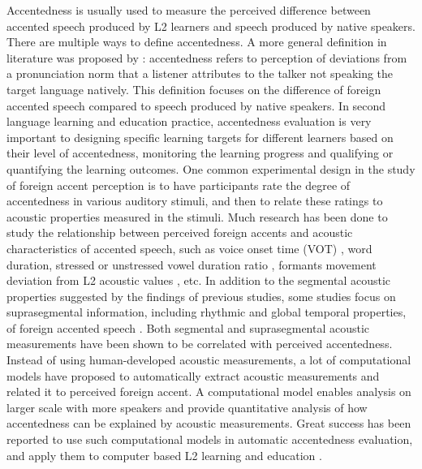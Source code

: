 Accentedness is usually used to measure the perceived difference between accented speech produced by L2 learners and speech produced by native speakers. There are multiple ways to define accentedness. A more general definition in literature was proposed by \cite{mccullough2013acoustic}: accentedness refers to perception of deviations from a pronunciation norm that a listener attributes to the talker not speaking the target language natively. This definition focuses on the difference of foreign accented speech compared to speech produced by native speakers. In second language learning and education practice, accentedness evaluation is very important to designing specific learning targets for different learners based on their level of accentedness, monitoring the learning progress and qualifying or quantifying the learning outcomes. One common experimental design in the study of foreign accent perception is to have participants rate the degree of accentedness in various auditory stimuli, and then to relate these ratings to acoustic properties measured in the stimuli. Much research has been done to study the relationship between perceived foreign accents and acoustic characteristics of accented speech, such as voice onset time (VOT) \citep{major1987english}, word duration, stressed or unstressed vowel duration ratio \citep{shah2002temporal}, formants movement deviation from L2 acoustic values \citep{munro1993productions}, etc. In addition to the segmental acoustic properties suggested by the findings of previous studies, some studies focus on suprasegmental information, including rhythmic and global temporal properties, of foreign accented speech \citep{munro2010detection,kang2010relative}. Both segmental and suprasegmental acoustic measurements have been shown to be correlated with perceived accentedness. Instead of using human-developed acoustic measurements, a lot of computational models have proposed to automatically extract acoustic measurements and related it to perceived foreign accent. A computational model enables analysis on larger scale with more speakers and provide quantitative analysis of how accentedness can be explained by acoustic measurements. Great success has been reported to use such computational models in automatic accentedness evaluation, and apply them to computer based L2 learning and education \citep{franco1997automatic,sangwan2012automatic,william2013automatic,chen2015automatic,tao2016exploring,qian2017bidirectional}.

